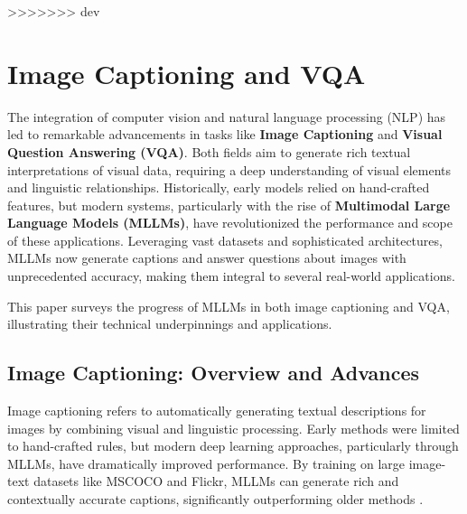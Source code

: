 \documentclass{article}
\begin{document}
>>>>>>> dev


\section{Image Captioning and VQA}
The integration of computer vision and natural language processing (NLP) has led to remarkable advancements in tasks like \textbf{Image Captioning} and \textbf{Visual Question Answering (VQA)}. Both fields aim to generate rich textual interpretations of visual data, requiring a deep understanding of visual elements and linguistic relationships. Historically, early models relied on hand-crafted features, but modern systems, particularly with the rise of \textbf{Multimodal Large Language Models (MLLMs)}, have revolutionized the performance and scope of these applications. Leveraging vast datasets and sophisticated architectures, MLLMs now generate captions and answer questions about images with unprecedented accuracy, making them integral to several real-world applications.

This paper surveys the progress of MLLMs in both image captioning and VQA, illustrating their technical underpinnings and applications.

\subsection{Image Captioning: Overview and Advances}
Image captioning refers to automatically generating textual descriptions for images by combining visual and linguistic processing. Early methods were limited to hand-crafted rules, but modern deep learning approaches, particularly through MLLMs, have dramatically improved performance. By training on large image-text datasets like MSCOCO and Flickr, MLLMs can generate rich and contextually accurate captions, significantly outperforming older methods \cite{icmeta2020m2transformer, icmeta2019oscar, icmeta2020densecap}.
\end{document}
